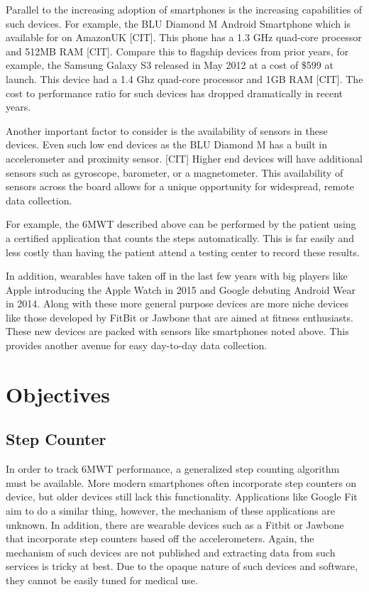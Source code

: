             Parallel to the increasing adoption of smartphones is the increasing capabilities of such devices. For example, the BLU Diamond M Android Smartphone which is available for  on AmazonUK [CIT]. This phone has a 1.3 GHz quad-core processor and 512MB RAM [CIT]. Compare this to flagship devices from prior years, for example, the Samsung Galaxy S3 released in May 2012 at a cost of \$599 at launch. This device had a 1.4 Ghz quad-core processor and 1GB RAM [CIT]. The cost to performance ratio for such devices has dropped dramatically in recent years.

            Another important factor to consider is the availability of sensors in these devices. Even such low end devices as the BLU Diamond M has a built in accelerometer and proximity sensor. [CIT] Higher end devices will have additional sensors such as gyroscope, barometer, or a magnetometer. This availability of sensors across the board allows for a unique opportunity for widespread, remote data collection. 

            For example, the 6MWT described above can be performed by the patient using a certified application that counts the steps automatically. This is far easily and less costly than having the patient attend a testing center to record these results.

            In addition, wearables have taken off in the last few years with big players like Apple introducing the Apple Watch in 2015 and Google debuting Android Wear in 2014. Along with these more general purpose devices are more niche devices like those developed by FitBit or Jawbone that are aimed at fitness enthusiasts. These new devices are packed with sensors like smartphones noted above. This provides another avenue for easy day-to-day data collection.

    \chapter{Objectives}

        \section{Step Counter}

            In order to track 6MWT performance, a generalized step counting algorithm must be available. More modern smartphones often incorporate step counters on device, but older devices still lack this functionality. Applications like Google Fit aim to do a similar thing, however, the mechanism of these applications are unknown. In addition, there are wearable devices such as a Fitbit or Jawbone that incorporate step counters based off the accelerometers. Again, the mechanism of such devices are not published and extracting data from such services is tricky at best. Due to the opaque nature of such devices and software, they cannot be easily tuned for medical use.

